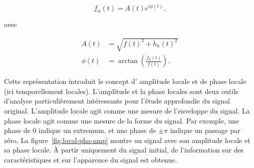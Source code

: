 \begin{equation}
    f_{\alpha} (t) = A(t)e^{i\phi(t)}.
\end{equation}

avec 

\begin{align}
    A(t) &= \sqrt{f(t)^2 + h_h(t)^2} \\
    \phi(t) &= \arctan\left(\frac{f_h(t)}{f(t)}\right).
\end{align}

Cette représentation introduit le concept d' \og amplitude locale \fg et de \og phase locale \fg (ici temporellement locales). L'amplitude et la phase locales sont deux outils d'analyse particulièrement intéressants pour l'étude approfondie du signal original. L'amplitude locale agit comme une mesure de l'enveloppe du signal. La phase locale agit comme une mesure de la forme du signal. Par exemple, une phase de $0$ indique un extremum, et une phase de $\pm\pi$ indique un passage par zéro. La figure~\ref{fig:local-pha-amp} montre un signal avec son amplitude locale et sa phase locale. À partir uniquement du signal initial, de l'information sur des caractéristiques et sur l'apparence du signal est obtenue.

